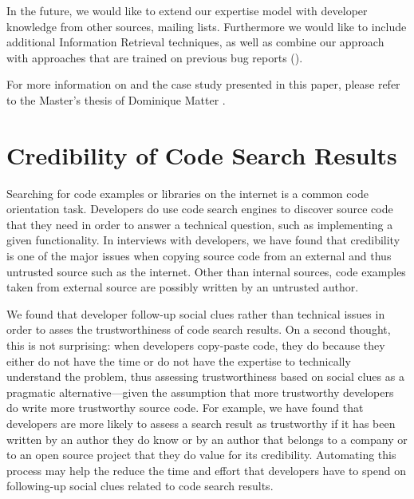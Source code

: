 \documentclass[10pt]{book}
\begin{document}
In the future, we would like to extend our expertise model with developer knowledge from other sources, \eg mailing lists. Furthermore we would like to include additional Information Retrieval techniques, as well as combine our approach with approaches that are trained on previous bug reports (\eg \cite{Anvi06a, Canf05a, Cubr04b, Lucc02a}).

For more information on \TOOL and the case study presented in this paper, please refer to the Master's thesis of Dominique Matter \cite{Matt09a}.



\chapter{Credibility of Code Search Results}
\label{the chapter on codesearch}


Searching for code examples or libraries on the internet is a common code orientation task. Developers do use code search engines to discover source code that they need in order to answer a technical question, such as implementing a given functionality. In interviews with developers, we have found that credibility is one of the major issues when copying source code from an external and thus untrusted source such as the internet. Other than internal sources, code examples taken from external source are possibly written by an untrusted author.

We found that developer follow-up social clues rather than technical issues in order to asses the trustworthiness of code search results. On a second thought, this is not surprising: when developers copy-paste code, they do because they either do not have the time or do not have the expertise to technically understand the problem, thus assessing trustworthiness based on social clues as a pragmatic alternative---given the assumption that more trustworthy developers do write more trustworthy source code. For example, we have found that developers are more likely to assess a search result as trustworthy if it has been written by an author they do know or by an author that belongs to a company or to an open source project that they do value for its credibility. Automating this process may help the reduce the time and effort that developers have to spend on following-up social clues related to code search results.
\end{document}
